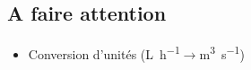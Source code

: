 \documentclass[]{article}
\begin{document}
\begin{multicols}{3}


\pagebreak

\pagebreak

\pagebreak

\pagebreak


















\section{A faire attention}
\begin{mdframed}[linewidth=1pt,linecolor=OrangeRed]
\begin{itemize}
\item Conversion d'unités (\si{\liter\per\hour}$\longrightarrow$\si{\cubic\meter\per\second})
\end{itemize}
\end{mdframed}


\end{multicols}
\end{document}
